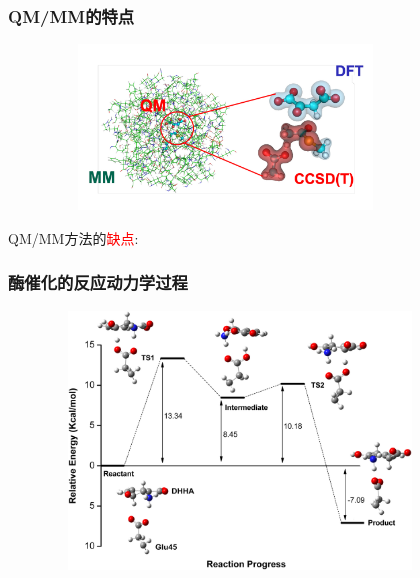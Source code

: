 \frame
{
	\frametitle{\textrm{QM/MM}的特点}
\begin{figure}[h!]
\centering
\vspace{-5.5pt}
\includegraphics[height=1.73in,width=3.70in,viewport=0 15 320 165,clip]{Figures/MM-QM-CCSD.jpg}
\label{MM-QM-CCSD}
\end{figure}
\textrm{QM/MM}方法的\textcolor{red}{缺点}:~
{\fontsize{8.0pt}{4.2pt}}
}

\frame
{
	\frametitle{酶催化的反应动力学过程}
\begin{figure}[h!]
\centering
\vspace{-10.5pt}
\includegraphics[height=2.70in,width=4.00in,viewport=0 0 500 370,clip]{Figures/Catalyst-reaction-path.png}
\label{enzyem-reaction-path-1}
\end{figure}
}

